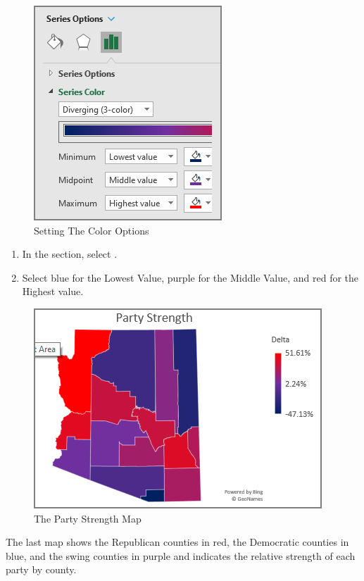 \begin{figure}[H]
	\centering
	\includegraphics[width=\maxwidth{.95\linewidth}]{gfx/ch08_fig42}
	\caption{Setting The Color Options}
	\label{08:fig42}
\end{figure}

\begin{enumerate}[resume]	
	\item In the  section, select .
	\item Select blue for the Lowest Value, purple for the Middle Value, and red for the Highest value.
\end{enumerate}

\begin{figure}[H]
	\centering
	\includegraphics[width=\maxwidth{.95\linewidth}]{gfx/ch08_fig43}
	\caption{The Party Strength Map}
	\label{08:fig43}
\end{figure}

The last map shows the Republican counties in red, the Democratic counties in blue, and the swing counties in purple and indicates the relative strength of each party by county.

